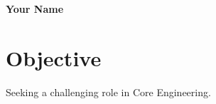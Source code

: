 \documentclass[a4paper,10pt]{article}
\begin{document}
\begin{center}

    {\huge \bf Your Name}

\end{center}

\section*{Objective}

Seeking a challenging role in Core Engineering.
\end{document}
